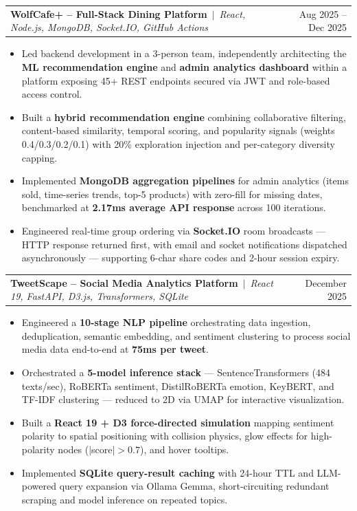 \documentclass[9pt, letterpaper]{article}
\makeatletter
\newcommand{\bulletListStart}{
  \begin{itemize}[
    leftmargin = 12pt,
    label      = \textbullet,
    topsep     = 1pt,
    itemsep    = 0pt,
    parsep     = 0pt
  ]
}
\newcommand{\bulletListEnd}{\end{itemize}}
\newcommand{\bitem}[1]{
  \item \small #1
}
\newcommand{\projectheading}[2]{
  \item
  \begin{tabular*}{\textwidth}{@{}l@{\extracolsep{\fill}}r@{}}
    \small #1 & \small #2
  \end{tabular*}
  \vspace{-6pt}
}
\makeatother
\begin{document}
  \projectheading
    {\textbf{WolfCafe+ -- Full-Stack Dining Platform}
     $\,|\,$ \textit{React, Node.js, MongoDB, Socket.IO, GitHub Actions}}
    {Aug 2025 -- Dec 2025}
  \bulletListStart
    \bitem{Led backend development in a 3-person team, independently
           architecting the \textbf{ML recommendation engine} and
           \textbf{admin analytics dashboard} within a platform
           exposing 45+ REST endpoints secured via JWT and
           role-based access control.}
    \bitem{Built a \textbf{hybrid recommendation engine} combining
           collaborative filtering, content-based similarity, temporal
           scoring, and popularity signals (weights 0.4/0.3/0.2/0.1)
           with 20\% exploration injection and per-category
           diversity capping.}
    \bitem{Implemented \textbf{MongoDB aggregation pipelines} for
           admin analytics (items sold, time-series trends, top-5
           products) with zero-fill for missing dates, benchmarked
           at \textbf{2.17ms average API response} across 100
           iterations.}
    \bitem{Engineered real-time group ordering via \textbf{Socket.IO}
           room broadcasts --- HTTP response returned first, with email
           and socket notifications dispatched asynchronously ---
           supporting 6-char share codes and 2-hour session expiry.}
  \bulletListEnd

  \projectheading
    {\textbf{TweetScape -- Social Media Analytics Platform}
     $\,|\,$ \textit{React 19, FastAPI, D3.js, Transformers, SQLite}}
    {December 2025}
  \bulletListStart
    \bitem{Engineered a \textbf{10-stage NLP pipeline} orchestrating
           data ingestion, deduplication, semantic embedding, and
           sentiment clustering to process social media data
           end-to-end at \textbf{75ms per tweet}.}
    \bitem{Orchestrated a \textbf{5-model inference stack} ---
           SentenceTransformers (484 texts/sec), RoBERTa sentiment,
           DistilRoBERTa emotion, KeyBERT, and TF-IDF clustering ---
           reduced to 2D via UMAP for interactive visualization.}
    \bitem{Built a \textbf{React 19 + D3 force-directed simulation}
           mapping sentiment polarity to spatial positioning with
           collision physics, glow effects for high-polarity nodes
           ($|$score$|>0.7$), and hover tooltips.}
    \bitem{Implemented \textbf{SQLite query-result caching} with
           24-hour TTL and LLM-powered query expansion via Ollama
           Gemma, short-circuiting redundant scraping and model
           inference on repeated topics.}
  \bulletListEnd
\end{document}
